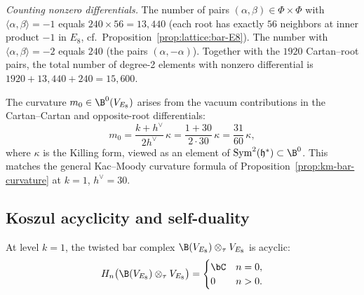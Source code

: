 \begin{computation}
\emph{Counting nonzero differentials.}
The number of pairs $(\alpha, \beta) \in \Phi \times \Phi$ with
$\langle \alpha, \beta \rangle = -1$ equals $240 \times 56 = 13{,}440$
(each root has exactly $56$ neighbors at inner product $-1$ in $E_8$,
cf.\ Proposition~\ref{prop:lattice:bar-E8}).
The number with $\langle \alpha, \beta \rangle = -2$
equals $240$ (the pairs $(\alpha, -\alpha)$).  Together with the $1920$
Cartan--root pairs, the total number of degree-2 elements with nonzero
differential is $1920 + 13{,}440 + 240 = 15{,}600$.
\end{computation}

\begin{computation}
\label{comp:E8-curvature}
The curvature $m_0 \in \B^0(V_{E_8})$ arises from the vacuum
contributions in the Cartan--Cartan and opposite-root differentials:
\begin{equation}\label{eq:E8-curvature}
m_0 = \frac{k + h^\vee}{2h^\vee}\,\kappa
= \frac{1 + 30}{2 \cdot 30}\,\kappa
= \frac{31}{60}\,\kappa,
\end{equation}
where $\kappa$ is the Killing form, viewed as an element of
$\mathrm{Sym}^2(\mathfrak{h}^*) \subset \B^0$.
This matches the general Kac--Moody curvature formula
of Proposition~\ref{prop:km-bar-curvature} at $k = 1$, $h^\vee = 30$.
\end{computation}

\subsection{Koszul acyclicity and self-duality}

\begin{proposition}
\label{prop:E8-koszul-acyclic}
At level $k = 1$, the twisted bar complex
$\B(V_{E_8}) \otimes_\tau V_{E_8}$ is acyclic:
\[
H_n\bigl(\B(V_{E_8}) \otimes_\tau V_{E_8}\bigr) = \begin{cases}
\bC & n = 0, \\
0 & n > 0.
\end{cases}
\]
\end{proposition}

